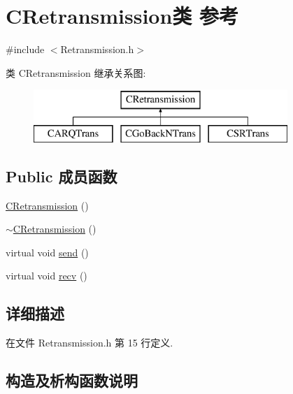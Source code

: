 \hypertarget{class_c_retransmission}{}\section{C\+Retransmission类 参考}
\label{class_c_retransmission}


{\ttfamily \#include $<$Retransmission.\+h$>$}

类 C\+Retransmission 继承关系图\+:\begin{figure}[H]
\begin{center}
\leavevmode
\includegraphics[height=2.000000cm]{class_c_retransmission}
\end{center}
\end{figure}
\subsection*{Public 成员函数}
\begin{DoxyCompactItemize}
\item 
\hyperlink{class_c_retransmission_a2246d5c5771f33f315bbbc1ec6e36685}{C\+Retransmission} ()
\item 
\hyperlink{class_c_retransmission_aba5baf50f86cf183e780add3562dfeca}{$\sim$\+C\+Retransmission} ()
\item 
virtual void \hyperlink{class_c_retransmission_a2a97991aa1bd05adf369d0a1b38b2a10}{send} ()
\item 
virtual void \hyperlink{class_c_retransmission_afd36095dafeb4a237e0b6f7c68bb989b}{recv} ()
\end{DoxyCompactItemize}


\subsection{详细描述}


在文件 Retransmission.\+h 第 15 行定义.



\subsection{构造及析构函数说明}
\mbox{\label{class_c_retransmission_a2246d5c5771f33f315bbbc1ec6e36685}} 
